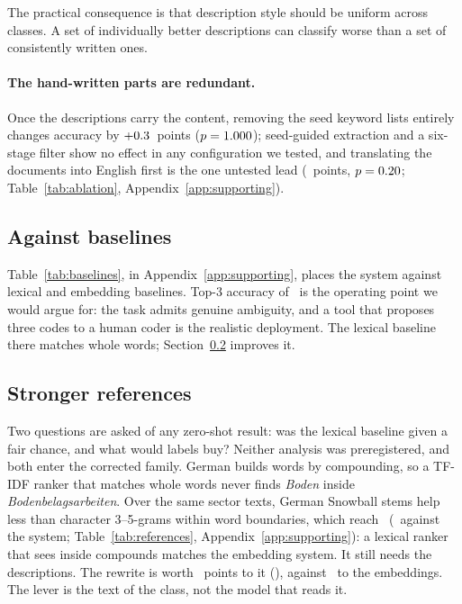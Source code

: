 \documentclass[11pt]{article}
\begin{document}
The practical consequence is that description style should be uniform across
classes. A set of individually better descriptions can classify worse than a set
of consistently written ones.

\paragraph{The hand-written parts are redundant.}
Once the descriptions carry the content, removing the seed keyword lists
entirely changes accuracy by $+0.3$~points
($p = 1.000$); seed-guided extraction and a six-stage filter show no
effect in any configuration we tested, and translating the documents into
English first is the one untested lead
(\TranslateGain~points, $p = 0.20$; Table~\ref{tab:ablation}, Appendix~\ref{app:supporting}).

\subsection{Against baselines}

Table~\ref{tab:baselines}, in Appendix~\ref{app:supporting}, places the system
against lexical and embedding baselines. Top-3 accuracy of \OursTopThree\ is the operating point we would
argue for: the task admits genuine ambiguity, and a tool that proposes three
codes to a human coder is the realistic deployment. The lexical baseline there
matches whole words; Section~\ref{sec:references} improves it.

\subsection{Stronger references}
\label{sec:references}



Two questions are asked of any zero-shot result: was the lexical baseline given
a fair chance, and what would labels buy? Neither analysis was preregistered,
and both enter the corrected family. German builds words by compounding, so a
TF-IDF ranker that matches whole words never finds \emph{Boden} inside
\emph{Bodenbelagsarbeiten}. Over the same sector texts, German Snowball stems help
less than character 3--5-grams within word boundaries, which reach
\RefCharTopOne\ (\RefCharPStat\ against the system; Table~\ref{tab:references},
Appendix~\ref{app:supporting}):
a lexical ranker that sees inside compounds matches the embedding system. It
still needs the descriptions. The rewrite is worth \RefCharDescGain~points to it
(\RefCharDescPStat), against \RefEmbedDescGain\ to the embeddings. The lever is
the text of the class, not the model that reads it.
\end{document}
